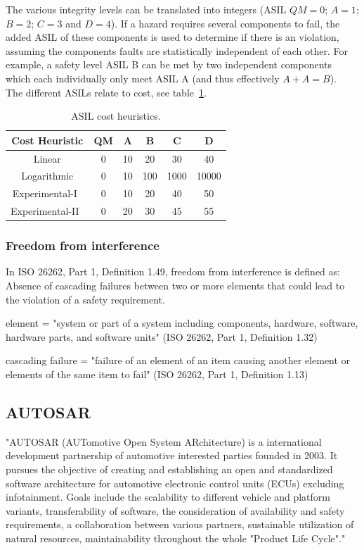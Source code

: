 The various integrity levels can be translated into integers (ASIL $QM = 0$; $A = 1$; $B = 2$; $C = 3$ and $D = 4$). If a hazard requires several components to fail, the added ASIL of these components is used to determine if there is an violation, assuming the components faults are statistically independent of each other. For example, a safety level ASIL B can be met by two independent components which each individually only meet ASIL A (and thus effectively $A + A = B$).~\cite{azevedo2014} \\ %

The different ASILs relate to cost, see table~\ref{table:cost_heuritics}. %

\begin{table}[H]
\centering
\begin{tabular}{|c|c|c|c|c|c|}
\hline
\textbf{Cost Heuristic} & \textbf{QM} & \textbf{A} & \textbf{B} & \textbf{C} & \textbf{D} \\ \hline
Linear & 0 & 10 & 20 & 30 & 40 \\ \hline
Logarithmic & 0 & 10 & 100 & 1000 & 10000 \\ \hline
Experimental-I~\cite{azevedo2014} & 0 & 10 & 20 & 40 & 50 \\ \hline
Experimental-II~\cite{azevedo2014} & 0 & 20 & 30 & 45 & 55 \\ \hline
\end{tabular}
\caption{ASIL cost heuristics.}
\label{table:cost_heuritics}
\end{table}


\subsubsection{Freedom from interference}
In ISO 26262, Part 1, Definition 1.49, freedom from interference is defined as: Absence of cascading failures between two or more elements that could lead to the violation of a safety requirement. 

element = "system or part of a system including components, hardware, software, hardware parts, and software units" (ISO 26262, Part 1, Definition 1.32)

cascading failure = "failure of an element of an item causing another element or elements of the same item to fail" (ISO 26262, Part 1, Definition 1.13)

\subsection{AUTOSAR}
"AUTOSAR (AUTomotive Open System ARchitecture) is a international development partnership of automotive interested parties founded in 2003. It pursues the objective of creating and establishing an open and standardized software architecture for automotive electronic control units (ECUs) excluding infotainment. Goals include the scalability to different vehicle and platform variants, transferability of software, the consideration of availability and safety requirements, a collaboration between various partners, sustainable utilization of natural resources, maintainability throughout the whole "Product Life Cycle"."~\cite{website:autosar}

